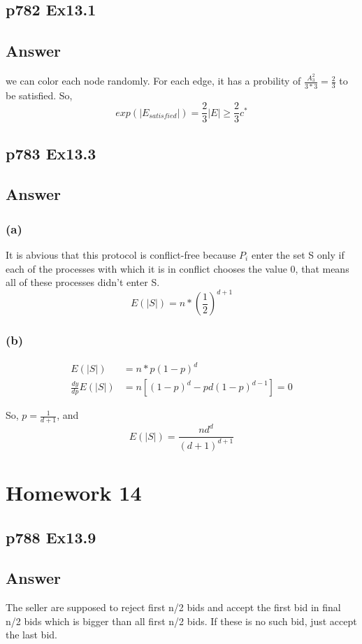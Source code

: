 \documentclass[a4paper]{article}
\begin{document}
\subsection*{p782 Ex13.1}
\subsection*{ Answer}
we can color each node randomly. For each edge, it has a probility of $\frac{A_3^2}{3*3} = \frac{2}{3}$ to be satisfied. So,
$$
	exp(|E_{satisfied}|)=\frac{2}{3}|E| \geq \frac{2}{3}c^*
$$
\vspace*{2cm}


\subsection*{p783 Ex13.3}
\subsection*{Answer}
\subsubsection*{(a)}
It is abvious that this protocol is conflict-free because $P_i$ enter the set S only if each of the processes with which it is in conflict chooses the value 0, that means all of these processes didn't enter S.
$$
	E(|S|) = n * (\frac{1}{2})^{d+1}
$$

\subsubsection*{(b)}
$$
	\begin{aligned}
		E(|S|)               & = n * p(1-p)^d                 \\
		\frac{dy}{dp} E(|S|) & = n[(1-p)^d-pd(1-p)^{d-1}] = 0
	\end{aligned}
$$

So, $p = \frac{1}{d+1}$, and
$$E(|S|) = \frac{nd^d}{(d+1)^{d+1}}
$$


\newpage
\section*{Homework 14}
\subsection*{p788 Ex13.9}
\subsection*{Answer}
The seller are supposed to reject first n/2 bids and accept the first bid in final n/2 bids which is bigger than all first n/2 bids. If these is no such bid, just accept the last bid.
\end{document}
